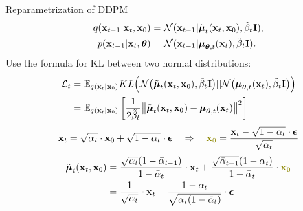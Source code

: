 \begin{frame}{Reparametrization of DDPM}
	\vspace{-0.5cm}
	\begin{align*}
		q(\mathbf{x}_{t-1} | \mathbf{x}_t, \mathbf{x}_0) &= \mathcal{N}(\mathbf{x}_{t-1} | \tilde{\boldsymbol{\mu}}_t(\mathbf{x}_t, \mathbf{x}_0), \tilde{\beta}_t \mathbf{I}); \\
		p(\mathbf{x}_{t - 1} | \mathbf{x}_t, \boldsymbol{\theta}) &= \mathcal{N} (\mathbf{x}_{t - 1} | \boldsymbol{\mu}_{\boldsymbol{\theta}, t}(\mathbf{x}_t), \tilde{\beta}_t \mathbf{I} ).
	\end{align*}
	Use the formula for KL between two normal distributions:
	\begin{align*}
		\mathcal{L}_t &= \mathbb{E}_{q(\mathbf{x}_t | \mathbf{x}_0)} KL\Bigl(\mathcal{N}\bigl(\tilde{\boldsymbol{\mu}}_t(\mathbf{x}_t, \mathbf{x}_0), \tilde{\beta}_t \mathbf{I} \bigr) || \mathcal{N}\bigl(\boldsymbol{\mu}_{\boldsymbol{\theta}, t}(\mathbf{x}_t), \tilde{\beta}_t \mathbf{I}\bigr)\Bigr) \\ 
		&= \mathbb{E}_{q(\mathbf{x}_t | \mathbf{x}_0)} \left[\frac{1}{2\tilde{\beta}_t} \bigl\| \tilde{\boldsymbol{\mu}}_t(\mathbf{x}_t, \mathbf{x}_0) - \boldsymbol{\mu}_{\boldsymbol{\theta}, t}(\mathbf{x}_t) \bigr\|^2  \right]
	\end{align*}
	\vspace{-0.2cm}
	\[
		\bx_t = \sqrt{\bar{\alpha}_t} \cdot \bx_0 + \sqrt{1 - \bar{\alpha}_t} \cdot \bepsilon \quad \Rightarrow \quad {\color{olive} \bx_0} = \frac{\bx_t -  \sqrt{1 - \bar{\alpha}_t} \cdot \bepsilon}{\sqrt{\bar{\alpha}_t}}
	\]
	\vspace{-0.2cm}
	\begin{align*}
		\tilde{\bmu}_t(\bx_t, \bx_0) &= \frac{\sqrt{\alpha_t}(1 - \bar{\alpha}_{t-1})}{1 - \bar{\alpha}_t} \cdot \bx_t + \frac{\sqrt{\bar{\alpha}_{t-1}}(1 - \alpha_t)}{1 - \bar{\alpha}_t} \cdot {\color{olive} \bx_0} \\
		&= \frac{1}{\sqrt{\alpha_t}} \cdot \bx_t - \frac{1 - \alpha_t}{\sqrt{\alpha_t (1 - \bar{\alpha}_t)}} \cdot \bepsilon
	\end{align*}
	\end{frame}
